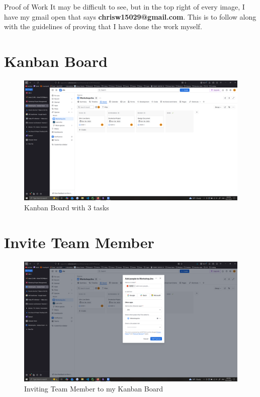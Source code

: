 \documentclass[12pt]{article}
\begin{document}
\maketitlepage

\begin{important}{Proof of Work}
    It may be difficult to see, but in the top right of every image, I have my gmail open that says \textbf{chrisw15029@gmail.com}. This is to follow along with the guidelines of proving that I have done the work myself.
\end{important}

\section{Kanban Board}

\begin{figure}[H]
    \centering
    \includegraphics[width=0.75\linewidth]{images/kanban_board_q1.png}
    \caption{Kanban Board with 3 tasks}
    \label{fig:q1}
\end{figure}

\section{Invite Team Member}

\begin{figure}[H]
    \centering
    \includegraphics[width=0.75\linewidth]{images/project_invite_q2.png}
    \caption{Inviting Team Member to my Kanban Board}
    \label{fig:q2}
\end{figure}
\end{document}
